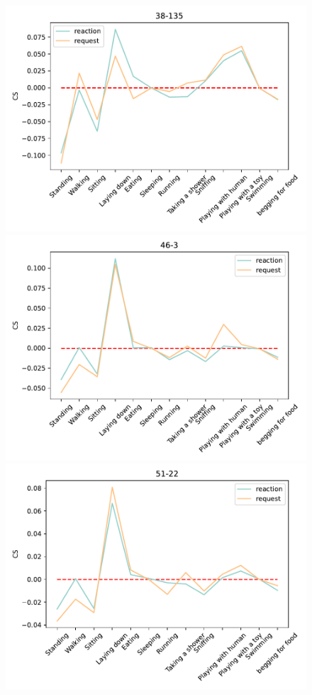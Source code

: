 \begin{figure}[ht]
		\begin{minipage}[b]{.3\linewidth}
			\centering
			\includegraphics[width=0.99\linewidth]{./35word/38-135.pdf}
		\end{minipage}
		\begin{minipage}[b]{.3\linewidth}
			\centering
			\includegraphics[width=0.99\linewidth]{./35word/46-3.pdf}
		\end{minipage}
		\begin{minipage}[b]{.3\linewidth}
			\centering
			\includegraphics[width=0.99\linewidth]{./35word/51-22.pdf}

\end{minipage}
\end{figure}
